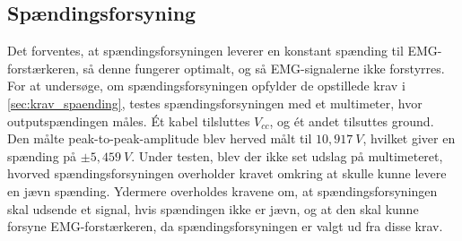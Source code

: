 \subsection{Spændingsforsyning} \label{test_spaendingsforsyning}

Det forventes, at spændingsforsyningen leverer en konstant spænding til EMG-forstærkeren, så denne fungerer optimalt, og så EMG-signalerne ikke forstyrres. For at undersøge, om spændingsforsyningen opfylder de opstillede krav i \ref{sec:krav_spaending}, testes spændingsforsyningen med et multimeter, hvor outputspændingen måles. Ét kabel tilsluttes $V_{cc}$, og ét andet tilsuttes ground. Den målte peak-to-peak-amplitude blev herved målt til $10,917~V$, hvilket giver en spænding på $\pm 5,459~V$. Under testen, blev der ikke set udslag på multimeteret, hvorved spændingsforsyningen overholder kravet omkring at skulle kunne levere en jævn spænding. 
Ydermere overholdes kravene om, at spændingsforsyningen skal udsende et signal, hvis spændingen ikke er jævn, og at den skal kunne forsyne EMG-forstærkeren, da spændingsforsyningen er valgt ud fra disse krav. 